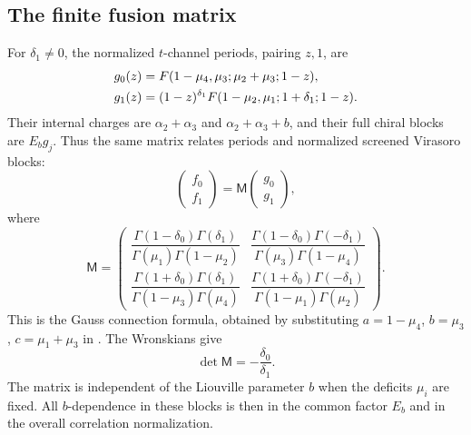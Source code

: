 \documentclass[11pt,a4paper]{article}
\numberwithin{equation}{section}
\theoremstyle{definition}
\theoremstyle{remark}
\begin{document}
\subsection{The finite fusion matrix}

For $\delta_1\ne0$, the normalized $t$-channel periods, pairing
$z,1$, are
\begin{align}
 g_0(z)&=F(1-\mu_4,\mu_3;\mu_2+\mu_3;1-z),\notag\\
 g_1(z)&=(1-z)^{\delta_1}
        F(1-\mu_2,\mu_1;1+\delta_1;1-z).
 \label{eq:screeningtbasis}
\end{align}
Their internal charges are $\alpha_2+\alpha_3$ and
$\alpha_2+\alpha_3+b$, and their full chiral blocks are
$E_b g_j$. Thus the same matrix relates periods and normalized
screened Virasoro blocks:
\begin{equation}
 \begin{pmatrix}f_0\\f_1\end{pmatrix}
  =\mathsf M\begin{pmatrix}g_0\\g_1\end{pmatrix},
 \label{eq:screeningfusionrelation}
\end{equation}
where
\begin{equation}
 \boxed{\quad
 \mathsf M=\begin{pmatrix}
 \dfrac{\Gamma(1-\delta_0)\Gamma(\delta_1)}
       {\Gamma(\mu_1)\Gamma(1-\mu_2)}
 &\dfrac{\Gamma(1-\delta_0)\Gamma(-\delta_1)}
       {\Gamma(\mu_3)\Gamma(1-\mu_4)}\\[10pt]
 \dfrac{\Gamma(1+\delta_0)\Gamma(\delta_1)}
       {\Gamma(1-\mu_3)\Gamma(\mu_4)}
 &\dfrac{\Gamma(1+\delta_0)\Gamma(-\delta_1)}
       {\Gamma(1-\mu_1)\Gamma(\mu_2)}
 \end{pmatrix}.
 \quad}
 \label{eq:screeningfusionmatrix}
\end{equation}
This is the Gauss connection formula, obtained by substituting
$a=1-\mu_4$, $b=\mu_3$, $c=\mu_1+\mu_3$ in
\cite[eqs.~15.10.21--22]{DLMF}. The Wronskians give
\begin{equation}
 \det\mathsf M=-\frac{\delta_0}{\delta_1}.
 \label{eq:fusiondeterminant}
\end{equation}
The matrix is independent of the Liouville parameter $b$ when
the deficits $\mu_i$ are fixed. All $b$-dependence in these
blocks is then in the common factor $E_b$ and in the overall
correlation normalization.
\end{document}
